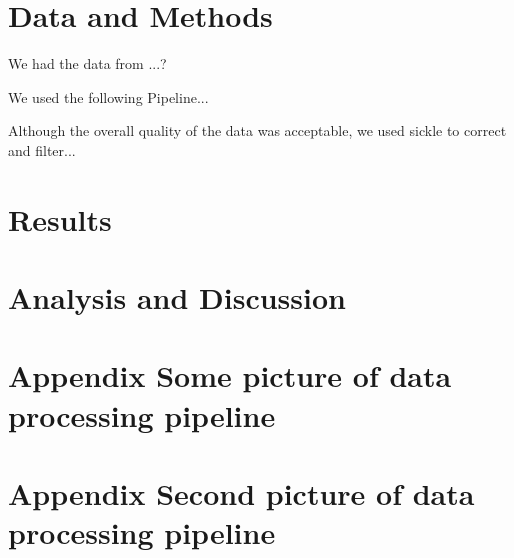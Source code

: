 \documentclass[10pt,a4paper]{article}
\begin{document}
\section{Data and Methods}
We had the data from ...?

We used the following Pipeline...

Although the overall quality of the data was acceptable, we used sickle to correct and filter...

\section{Results}




\section{Analysis and Discussion}

\pagebreak
\appendix
\section{Appendix Some picture of data processing pipeline}
\section{Appendix Second picture of data processing pipeline}

\printbibliography
\end{document}
